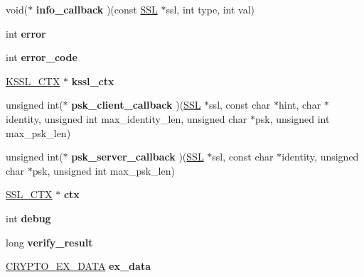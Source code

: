 \begin{DoxyCompactItemize}
\mbox{\label{structssl__st_aaf32f29b307cfa33c4a19a7cf11bc36f}} 
void($\ast$ {\bfseries info\+\_\+callback} )(const \hyperlink{structssl__st}{S\+SL} $\ast$ssl, int type, int val)
\item 
\mbox{\label{structssl__st_aca7ac14e5548bdd96990fa1d12aaef02}} 
int {\bfseries error}
\item 
\mbox{\label{structssl__st_a6a6c337340e6b5986ca6a1381838c9ae}} 
int {\bfseries error\+\_\+code}
\item 
\mbox{\label{structssl__st_a1b2e26d71535a556a65c577216336e31}} 
\hyperlink{structkssl__ctx__st}{K\+S\+S\+L\+\_\+\+C\+TX} $\ast$ {\bfseries kssl\+\_\+ctx}
\item 
\mbox{\label{structssl__st_ade63f7a47c12d1957f6ccff7b374c69c}} 
unsigned int($\ast$ {\bfseries psk\+\_\+client\+\_\+callback} )(\hyperlink{structssl__st}{S\+SL} $\ast$ssl, const char $\ast$hint, char $\ast$identity, unsigned int max\+\_\+identity\+\_\+len, unsigned char $\ast$psk, unsigned int max\+\_\+psk\+\_\+len)
\item 
\mbox{\label{structssl__st_a2e36d9d815a0c1acd8d4cae04ad88aa1}} 
unsigned int($\ast$ {\bfseries psk\+\_\+server\+\_\+callback} )(\hyperlink{structssl__st}{S\+SL} $\ast$ssl, const char $\ast$identity, unsigned char $\ast$psk, unsigned int max\+\_\+psk\+\_\+len)
\item 
\mbox{\label{structssl__st_a5a3ac76eff749d5d3c9ecf6b1a230497}} 
\hyperlink{structssl__ctx__st}{S\+S\+L\+\_\+\+C\+TX} $\ast$ {\bfseries ctx}
\item 
\mbox{\label{structssl__st_a44db2b5a38c43821c3a852669e48d67f}} 
int {\bfseries debug}
\item 
\mbox{\label{structssl__st_a3092706c43455cf6a410853d90aadb1f}} 
long {\bfseries verify\+\_\+result}
\item 
\mbox{\label{structssl__st_ab71808924564517a2cfa30d1d5da910e}} 
\hyperlink{structcrypto__ex__data__st}{C\+R\+Y\+P\+T\+O\+\_\+\+E\+X\+\_\+\+D\+A\+TA} {\bfseries ex\+\_\+data}

\end{DoxyCompactItemize}
